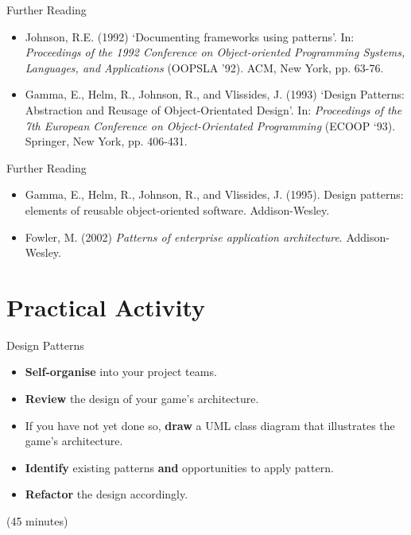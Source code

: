 \begin{frame}{Further Reading}
	\begin{itemize}
		\item Johnson, R.E. (1992) `Documenting frameworks using patterns'. In: \textit{Proceedings of the 1992 Conference on 
		Object-oriented Programming Systems, Languages, and Applications} (OOPSLA '92). ACM, New York, pp. 63-76.
		\vspace{1ex}
		\item Gamma, E., Helm, R., Johnson, R., and Vlissides, J. (1993) `Design Patterns: Abstraction and Reusage of
		Object-Orientated Design'. In: \textit{Proceedings of the 7th European Conference on Object-Orientated Programming}
		(ECOOP `93). Springer, New York, pp. 406-431.
	\end{itemize}
\end{frame}

\begin{frame}{Further Reading}
	\begin{itemize}
		\item Gamma, E., Helm, R., Johnson, R., and Vlissides, J. (1995). Design patterns: elements of reusable object-oriented software. Addison-Wesley.
		\vspace{2ex}
		\item Fowler, M. (2002) \textit{Patterns of enterprise application architecture}. Addison-Wesley.
	\end{itemize}
\end{frame}



\part{Practical Activity}
\frame{\partpage}

\begin{frame}{Design Patterns}
	\begin{itemize}
		\item \textbf{Self-organise} into your project teams.
		\item \textbf{Review} the design of your game's architecture.
		\item If you have not yet done so, \textbf{draw} a UML class diagram that illustrates the game's architecture.
		\item \textbf{Identify} existing patterns \textbf{and} opportunities to apply pattern.
		\item \textbf{Refactor} the design accordingly.
	\end{itemize}
	
	(45 minutes)
\end{frame}
		
